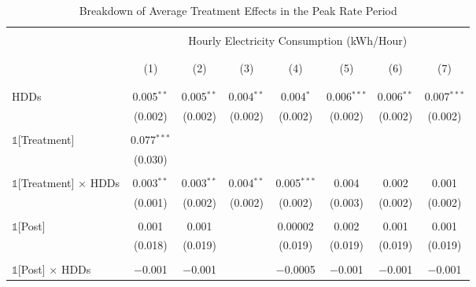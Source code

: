 \begin{table}[!th]
\caption{Breakdown of Average Treatment Effects in the Peak Rate Period}
\label{Table:Breakdown-of-Average-Treatment-Effects-in-the-Peak-Rate-Period}
\centering
\small
\begin{adjustbox}{scale = 0.8}
\begin{tabular}{@{\extracolsep{5pt}}lccccccc}
\\[-5.5ex]
\hline \hline
\\[-3.0ex]
& \multicolumn{7}{c}{Hourly Electricity Consumption  (kWh/Hour)} \\
\\[-3.0ex]
\cline{2-8}
\\[-3.0ex]
& (1) & (2) & (3) & (4) & (5) & (6) & (7) \\
\\[-3.0ex]
\hline
\\[-2.0ex]
HDDs & 0.005$^{**}$ & 0.005$^{**}$ & 0.004$^{**}$ & 0.004$^{*}$ & 0.006$^{***}$ & 0.006$^{**}$ & 0.007$^{***}$ \\
& (0.002) & (0.002) & (0.002)  & (0.002) & (0.002) & (0.002) & (0.002) \\
& & & & & & & \\
$\mathbb{1}$[Treatment] & 0.077$^{***}$ & & \\
& (0.030) &  & \\
& & & & & & & \\
$\mathbb{1}$[Treatment] $\times$ HDDs & 0.003$^{**}$ & 0.003$^{**}$ & 0.004$^{**}$ & 0.005$^{***}$ & 0.004 & 0.002 & 0.001 \\
& (0.001) & (0.002) & (0.002) & (0.002) & (0.003) & (0.002) & (0.002) \\
& & & & & & & \\
$\mathbb{1}$[Post] & 0.001 & 0.001 & & 0.00002 & 0.002 & 0.001 & 0.001 \\
& (0.018) & (0.019) & & (0.019) & (0.019) & (0.019) & (0.019) \\
& & & & & & & \\
$\mathbb{1}$[Post] $\times$ HDDs & $-$0.001 & $-$0.001 & & $-$0.0005 & $-$0.001 & $-$0.001 & $-$0.001 \\

\end{tabular}
\end{adjustbox}
\end{table}
